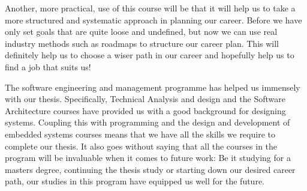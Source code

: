 \documentclass{article}
\begin{document}
Another, more practical, use of this course will be that it will help us to take a more structured and systematic approach in planning our career. Before we have only set goals that are quite loose and undefined, but now we can use real industry methods such as roadmaps to structure our career plan. This will definitely help us to choose a wiser path in our career and hopefully help us to find a job that suits us! 

The software engineering and management programme has helped us immensely with our thesis. Specifically, Technical Analysis and design and the Software Architecture courses have provided us with a good background for designing systems. Coupling this with programming and the design and development of embedded systems courses means that we have all the skills we require to complete our thesis. It also goes without saying that all the courses in the program will be invaluable when it comes to future work: Be it studying for a masters degree, continuing the thesis study or starting down our desired career path, our studies in this program have equipped us well for the future.





\end{document}
